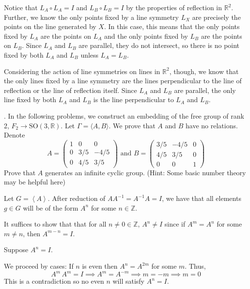 \documentclass[12pt]{article}
\newcommand{\Z}{\mathbb{Z}}
\newcommand{\R}{\mathbb{R}}
\newcommand{\SO}{\text{SO}}
\newcommand{\lra}{\longrightarrow}
\newcommand{\brak}[1]{\left\langle #1 \right\rangle}
\begin{document}
    \color{blue}
        Notice that $L_A \circ L_A = I$ and $L_B \circ L_B = I$ by the properties of reflection in $\R^2$. Further, we know the only points fixed by a line symmetry $L_X$ are precisely the points on the line generated by $X$. In this case, this means that the only points fixed by $L_A$ are the points on $L_A$ and the only points fixed by $L_B$ are the points on $L_B$. Since $L_A$ and $L_B$ are parallel, they do not intersect, so there is no point fixed by both $L_A$ and $L_B$ unless $L_A = L_B$.
        
        Considering the action of line symmetries on lines in $\R^2$, though, we know that the only lines fixed by a line symmetry are the lines perpendicular to the line of reflection or the line of reflection itself. Since $L_A$ and $L_B$ are parallel, the only line fixed by both $L_A$ and $L_B$ is the line perpendicular to $L_A$ and $L_B$.
    \color{black}


.  In the following problems, we construct an embedding of the free group of rank 2, $F_{2} \lra \SO(3,\R)$.  Let $\Gamma = \langle A, B \rangle$.  We prove that $A$ and $B$ have no relations.  Denote
\[A = \left(
    \begin{array}{ccc}
    1 & 0 & 0 \\
    0 & 3/5 & -4/5 \\
    0 & 4/5 & 3/5
\end{array}\right) \text{ and } B = \left(
    \begin{array}{ccc}
    3/5 & -4/5 & 0 \\
    4/5 & 3/5 & 0 \\
    0 & 0 & 1
    \end{array}
\right)\]
Prove that $A$ generates an infinite cyclic group. (Hint:  Some basic number theory may be helpful here)

    \color{blue}
        Let $G = \brak{A}$. After reduction of $AA^{-1} = A^{-1}A = I$, we have that all elements $g \in G$ will be of the form $A^n$ for some $n \in \Z$. 
        
        It suffices to show that that for all $n \neq 0 \in \Z$, $A^n \neq I$ since if $A^m = A^n$ for some $m \neq n$, then $A^{m-n} = I$.

        Suppose $A^n = I$.
        
        We proceed by cases: If $n$ is even then $A^n = A^{2m}$ for some $m$. Thus, 
        \[A^m \, A^m = I \implies A^m = A^{-m} \implies m = -m \implies m = 0\]
        This is a contradiction so no even $n$ will satisfy $A^n = I$.
\end{document}

